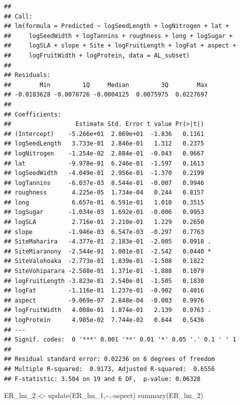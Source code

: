 \documentclass[
  12pt,
]{article}
\newenvironment{Shaded}{\begin{snugshade}}{\end{snugshade}}
\newcommand{\FunctionTok}[1]{\textcolor[rgb]{0.00,0.00,0.00}{#1}}
\newcommand{\NormalTok}[1]{#1}
\newcommand{\OtherTok}[1]{\textcolor[rgb]{0.56,0.35,0.01}{#1}}
\newcommand{\SpecialCharTok}[1]{\textcolor[rgb]{0.00,0.00,0.00}{#1}}
\begin{document}
\begin{verbatim}
## 
## Call:
## lm(formula = Predicted ~ logSeedLength + logNitrogen + lat + 
##     logSeedWidth + logTannins + roughness + long + logSugar + 
##     logSLA + slope + Site + logFruitLength + logFat + aspect + 
##     logFruitWidth + logProtein, data = AL_subset)
## 
## Residuals:
##        Min         1Q     Median         3Q        Max 
## -0.0183628 -0.0078726 -0.0004125  0.0075975  0.0227697 
## 
## Coefficients:
##                  Estimate Std. Error t value Pr(>|t|)  
## (Intercept)    -5.266e+01  2.869e+01  -1.836   0.1161  
## logSeedLength   3.733e-01  2.846e-01   1.312   0.2375  
## logNitrogen    -1.254e-02  2.884e-01  -0.043   0.9667  
## lat            -9.978e-01  6.246e-01  -1.597   0.1613  
## logSeedWidth   -4.049e-01  2.956e-01  -1.370   0.2199  
## logTannins     -6.037e-03  8.544e-01  -0.007   0.9946  
## roughness       4.225e-05  1.734e-04   0.244   0.8157  
## long            6.657e-01  6.591e-01   1.010   0.3515  
## logSugar       -1.034e-03  1.692e-01  -0.006   0.9953  
## logSLA          2.716e-01  2.210e-01   1.229   0.2650  
## slope          -1.946e-03  6.547e-03  -0.297   0.7763  
## SiteMaharira   -4.377e-01  2.183e-01  -2.005   0.0918 .
## SiteMiaranony  -2.544e-01  1.001e-01  -2.542   0.0440 *
## SiteValohoaka  -2.773e-01  1.839e-01  -1.508   0.1822  
## SiteVohiparara -2.588e-01  1.371e-01  -1.888   0.1079  
## logFruitLength -3.823e-01  2.540e-01  -1.505   0.1830  
## logFat         -1.116e-01  1.237e-01  -0.902   0.4016  
## aspect         -9.069e-07  2.848e-04  -0.003   0.9976  
## logFruitWidth   4.008e-01  1.874e-01   2.139   0.0763 .
## logProtein      4.985e-02  7.744e-02   0.644   0.5436  
## ---
## Signif. codes:  0 '***' 0.001 '**' 0.01 '*' 0.05 '.' 0.1 ' ' 1
## 
## Residual standard error: 0.02236 on 6 degrees of freedom
## Multiple R-squared:  0.9173, Adjusted R-squared:  0.6556 
## F-statistic: 3.504 on 19 and 6 DF,  p-value: 0.06328
\end{verbatim}

\begin{Shaded}
\begin{Highlighting}[]
\NormalTok{ER\_lm\_2 }\OtherTok{\textless{}{-}} \FunctionTok{update}\NormalTok{(ER\_lm\_1,}\SpecialCharTok{\textasciitilde{}}\NormalTok{.}\SpecialCharTok{{-}}\NormalTok{aspect)}
\FunctionTok{summary}\NormalTok{(ER\_lm\_2)}
\end{Highlighting}
\end{Shaded}
\end{document}
